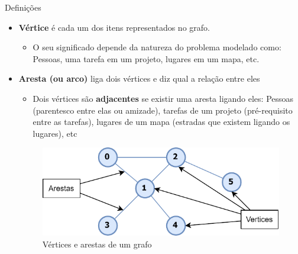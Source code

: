 \documentclass{if-beamer}
\begin{document}
\begin{frame}{Definições} 
\begin{itemize}
\justifying
\item \textbf{Vértice} é cada um dos itens representados no grafo.
\begin{itemize}
\vspace{0.3cm}
\item O seu significado depende da natureza do problema modelado como: Pessoas, uma tarefa em um projeto, lugares em um mapa, etc.
\end{itemize}
\item \textbf{Aresta (ou arco)} liga dois vértices e diz qual a relação entre eles
\begin{itemize}
\vspace{0.3cm}
\item Dois vértices são  \textbf{adjacentes} se existir uma aresta ligando eles: Pessoas (parentesco entre elas ou amizade), tarefas de um projeto (pré-requisito entre as tarefas), lugares de um mapa (estradas que existem ligando os lugares), etc
\end{itemize} 
\begin{figure}
  \centering
  \includegraphics[scale=0.80]{Figuras/exemplos-grafo/f_svg-tex.pdf}
  \caption{Vértices e arestas de um grafo}
\end{figure}

\end{itemize} 
\end{frame}
\end{document}
